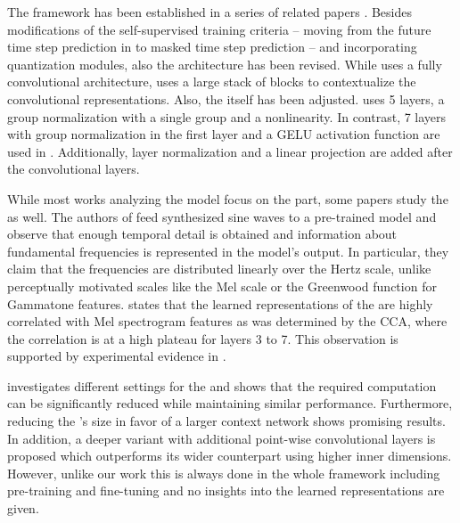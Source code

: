 \documentclass{INTERSPEECH2023}
\begin{document}
The \wv framework has been established in a series of related papers \cite{facebook2019wav2vec, facebook2019vqwav2vec, facebook2020wav2vec2, facebook2020xlsr}.
Besides modifications of the self-supervised training criteria -- moving from the future time step prediction in \cite{facebook2019wav2vec} to masked time step prediction -- and incorporating quantization modules, also the architecture has been revised.
While \cite{facebook2019wav2vec} uses a fully convolutional architecture, \cite{facebook2020wav2vec2} uses a large stack of \transformer blocks to contextualize the convolutional representations.
%
Also, the \fe itself has been adjusted.
\cite{facebook2019wav2vec} uses 5 layers, a group normalization with a single group and a \relu nonlinearity.
In contrast, 7 layers with group normalization in the first layer and a GELU activation function are used in \cite{facebook2020wav2vec2}.
Additionally, layer normalization and a linear projection are added after the convolutional layers.

While most works analyzing the \wvtwo model focus on the \transformer part, some papers study the \fe as well.
The authors of \cite{choi2022w2v2fe} feed synthesized sine waves to a pre-trained model and observe that enough temporal detail is obtained and information about fundamental frequencies is represented in the model's output.
In particular, they claim that the frequencies are distributed linearly over the Hertz scale, unlike perceptually motivated scales like the Mel scale or the Greenwood function for Gammatone features.
\cite{livescu2021wav2vec_analysis} states that the learned representations of the \fe are highly correlated with Mel spectrogram features as was determined by the \gls{CCA}, where the correlation is at a high plateau for \fe layers 3 to 7.
This observation is supported by experimental evidence in \cite{dieck2022wav2vec}.

\cite{asapp2022performance} investigates different settings for the \wvtwo \fe and shows that the required computation can be significantly reduced while maintaining similar performance.
Furthermore, reducing the \fe's size in favor of a larger context network shows promising results.
In addition, a deeper variant with additional point-wise convolutional layers is proposed which outperforms its wider counterpart using higher inner dimensions.
However, unlike our work this is always done in the whole \wvtwo framework including pre-training and fine-tuning and no insights into the learned representations are given.
\end{document}
